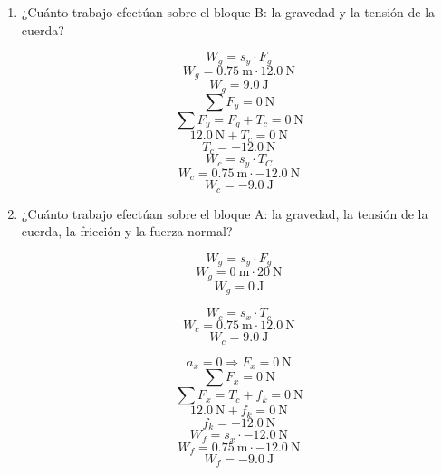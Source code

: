\documentclass[Física - Práctica.root.tex]{subfiles}
\begin{document}
\begin{enumerate}
\begin{multicols}{2}
          \begin{center}
          \end{center}
        \end{multicols}
        \begin{enumerate}
          \item ¿Cuánto trabajo efectúan sobre el bloque B: la gravedad y la tensión de la cuerda?
                \begin{center}
                  \[ W_g = s_y\cdot F_g \]
                  \[ W_g = \SI{0,75}{\meter}\cdot\SI{12,0}{\newton} \]
                  \[ \boxed{W_g = \SI{9,0}{\joule}} \]
                  \[ \sum F_y = \SI{0}{\newton} \]
                  \[ \sum F_y = F_g + T_c = \SI{0}{\newton} \]
                  \[ \SI{12,0}{\newton} + T_c = \SI{0}{\newton} \]
                  \[ T_c = \SI{-12,0}{\newton} \]
                  \[ W_c = s_y\cdot T_C \]
                  \[ W_c = \SI{0,75}{\meter}\cdot\SI{-12,0}{\newton} \]
                  \[ \boxed{W_c = \SI{-9,0}{\joule}} \]
                \end{center}
          \item ¿Cuánto trabajo efectúan sobre el bloque A: la gravedad, la tensión de la cuerda, la fricción y la fuerza normal?
                \begin{center}

                  \[ W_g = s_y\cdot F_g \]
                  \[ W_g = \SI{0}{\meter}\cdot\SI{20}{\newton} \]
                  \[ \boxed{W_g = \SI{0}{\joule}} \]

                  \[ W_c = s_x\cdot T_c \]
                  \[ W_c = \SI{0,75}{\meter}\cdot\SI{12,0}{\newton} \]
                  \[ \boxed{W_c = \SI{9,0}{\joule}} \]

                  \[ a_x = 0 \Rightarrow F_x = \SI{0}{\newton} \]
                  \[ \sum F_x = \SI{0}{\newton} \]
                  \[ \sum F_x = T_c + f_k = \SI{0}{\newton} \]
                  \[ \SI{12,0}{\newton} + f_k = \SI{0}{\newton} \]
                  \[ f_k = \SI{-12,0}{\newton} \]
                  \[ W_f = s_x\cdot\SI{-12,0}{\newton} \]
                  \[ W_f = \SI{0,75}{\meter}\cdot\SI{-12,0}{\newton} \]
                  \[ \boxed{W_f = \SI{-9,0}{\joule}} \]


\end{center}
\end{enumerate}
\end{enumerate}
\end{document}
